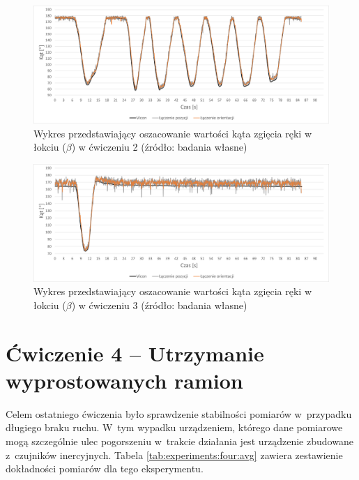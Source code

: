 \begin{savenotes}
	\begin{figure}[!htb]
		\centering
		\includegraphics[width=\textwidth]{images/200/angle.png}
		\caption{Wykres przedstawiający oszacowanie wartości kąta zgięcia ręki w łokciu ($\beta$) w ćwiczeniu 2 (źródło: badania własne)}
		\label{fig:experiments:second:angle}
	\end{figure}
\end{savenotes}
\begin{savenotes}
	\begin{figure}[!htb]
		\centering
		\includegraphics[width=\textwidth]{images/300/angle.png}
		\caption{Wykres przedstawiający oszacowanie wartości kąta zgięcia ręki w łokciu ($\beta$) w ćwiczeniu 3  (źródło: badania własne)}
		\label{fig:experiments:third:angle}
	\end{figure}
\end{savenotes}
																				
\section*{Ćwiczenie 4 -- Utrzymanie wyprostowanych ramion}
Celem ostatniego ćwiczenia było sprawdzenie stabilności pomiarów w~przypadku długiego braku ruchu. W~tym wypadku urządzeniem, którego dane pomiarowe mogą szczególnie ulec pogorszeniu w~trakcie działania jest urządzenie zbudowane z~czujników inercyjnych. Tabela \ref{tab:experiments:four:avg} zawiera zestawienie dokładności pomiarów dla tego eksperymentu.
																				
